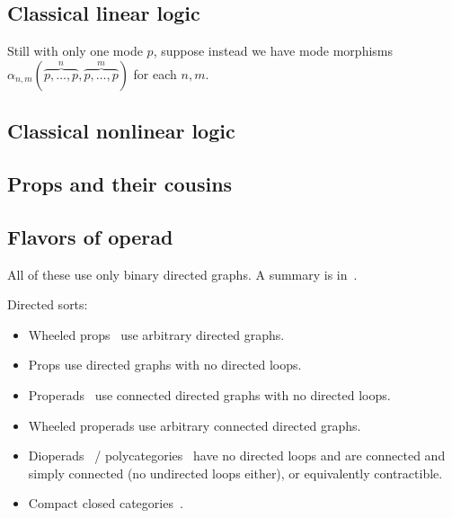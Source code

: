 \documentclass{article}
\theoremstyle{definition}
\theoremstyle{remark}
\begin{document}
\subsection{Classical linear logic}
\label{sec:cll}

Still with only one mode $p$, suppose instead we have mode morphisms $\alpha_{n,m}(\overbrace{p,\dots,p}^n,\overbrace{p,\dots,p}^m)$ for each $n,m$.


\subsection{Classical nonlinear logic}
\label{sec:cl}



\subsection{Props and their cousins}
\label{sec:props}




\subsection{Flavors of operad}
\label{sec:operads}

All of these use only binary directed graphs.
A summary is in~\cite{bb:htapm}.

Directed sorts:
\begin{itemize}
\item Wheeled props~\cite{mms:wheeled-props} use arbitrary directed graphs.
\item Props use directed graphs with no directed loops.
\item Properads~\cite{vallette:properads} use connected directed graphs with no directed loops.
\item Wheeled properads use arbitrary connected directed graphs.
\item Dioperads~\cite{gan:dioperads} / polycategories~\cite{szabo:polycats,koslowski:polycats,garner:polycats} have no directed loops and are connected and simply connected (no undirected loops either), or equivalently contractible.~\cite{markl:operads-props}
\item Compact closed categories~\cite{kl:cpt}.
\end{itemize}
\end{document}
